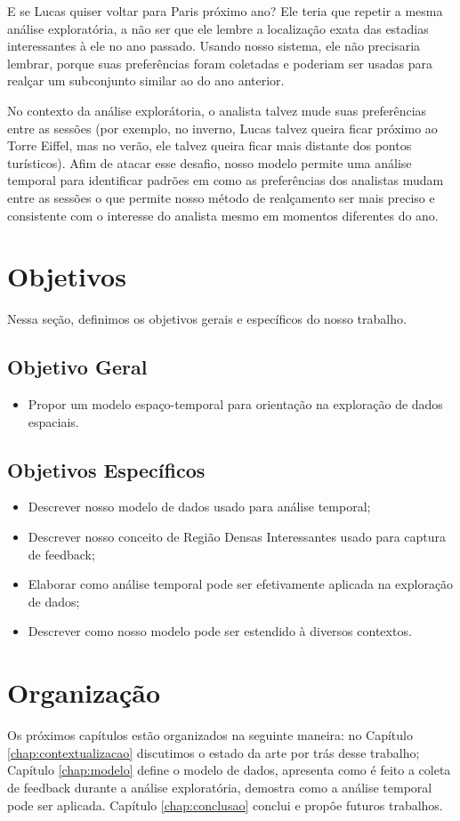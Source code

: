 E se Lucas quiser voltar para Paris próximo ano? Ele teria que repetir a mesma análise exploratória, a não ser que ele lembre a localização exata das estadias interessantes à ele no ano passado. Usando nosso sistema, ele não precisaria lembrar, porque suas preferências foram coletadas e poderiam ser usadas para realçar um subconjunto similar ao do ano anterior.

No contexto da análise explorátoria, o analista talvez mude suas preferências entre as sessões (por exemplo, no inverno, Lucas talvez queira ficar próximo ao Torre Eiffel, mas no verão, ele talvez queira ficar mais distante dos pontos turísticos). Afim de atacar esse desafio, nosso modelo permite uma análise temporal para identificar padrões em como as preferências dos analistas mudam entre as sessões o que permite nosso método de realçamento ser mais preciso e consistente com o interesse do analista mesmo em momentos diferentes do ano.

\section{Objetivos}

Nessa seção, definimos os objetivos gerais e específicos do nosso trabalho.

\subsection{Objetivo Geral}

\begin{itemize}
	\item Propor um modelo espaço-temporal para orientação na exploração de dados espaciais.
\end{itemize}

\subsection{Objetivos Específicos}

\begin{itemize}
	\item Descrever nosso modelo de dados usado para análise temporal;
	\item Descrever nosso conceito de Região Densas Interessantes usado para captura de feedback;
	\item Elaborar como análise temporal pode ser efetivamente aplicada na exploração de dados;
	\item Descrever como nosso modelo pode ser estendido à diversos contextos.
\end{itemize}

\section{Organização}

Os próximos capítulos estão organizados na seguinte maneira: no Capítulo \ref{chap:contextualizacao} discutimos o estado da arte por trás desse trabalho; Capítulo \ref{chap:modelo} define o modelo de dados, apresenta como é feito a coleta de feedback durante a análise exploratória, demostra como a análise temporal pode ser aplicada. Capítulo \ref{chap:conclusao} conclui e propôe futuros trabalhos.
